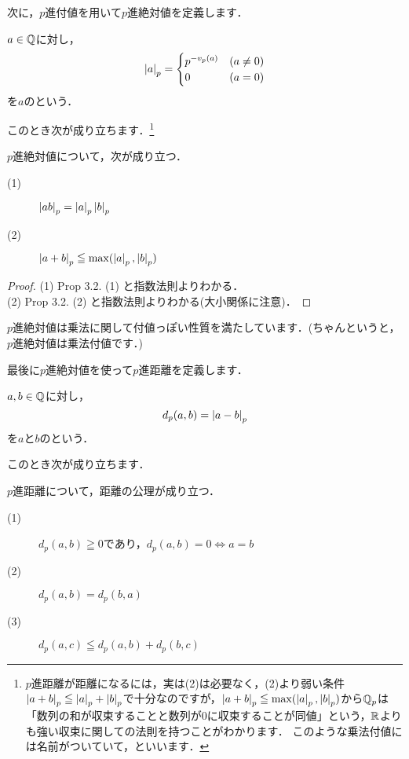 \documentclass[./main]{subfiles}
\begin{document}
次に，$p$進付値を用いて$p$進絶対値を定義します．

\begin{defi}
$a \in \mathbb{Q}$に対し，
\begin{equation*}
\left\lvert a\right\rvert_p= \begin{cases}
	p^{-v_p(a)} &(a \neq 0)\\
	0 &(a=0)
	\end{cases}
\end{equation*}
を$a$のという．
\end{defi}

このとき次が成り立ちます．\footnote{$p$進距離が距離になるには，実は(2)は必要なく，(2)より弱い条件$\left\lvert a+b\right\rvert_p \leqq \left\lvert a\right\rvert_p+\left\lvert b\right\rvert_p$で十分なのですが，$\left\lvert a+b\right\rvert_p \leqq \max(\left\lvert a\right\rvert_p,\left\lvert b\right\rvert_p)$から$\mathbb{Q}_p$は「数列の和が収束することと数列が0に収束することが同値」という，$\mathbb{R}$よりも強い収束に関しての法則を持つことがわかります．
このような乗法付値には名前がついていて，といいます．}
\begin{prop}
$p$進絶対値について，次が成り立つ．
\begin{description}
	\item[(1)] $\left\lvert ab\right\rvert_p=\left\lvert a\right\rvert_p \left\lvert b\right\rvert_p$
	\item[(2)] $\left\lvert a+b\right\rvert_p \leqq \max(\left\lvert a\right\rvert_p,\left\lvert b\right\rvert_p)$
\end{description}
\end{prop}

\begin{proof}
	(1) Prop 3.2. (1) と指数法則よりわかる．\\
	(2) Prop 3.2. (2) と指数法則よりわかる(大小関係に注意)．
\end{proof}


$p$進絶対値は乗法に関して付値っぽい性質を満たしています．(ちゃんというと，$p$進絶対値は乗法付値です．)

最後に$p$進絶対値を使って$p$進距離を定義します．

\begin{defi}
$a,b \in \mathbb{Q}$に対し，
\begin{equation*}
d_p(a,b)=\left\lvert a-b\right\rvert_p
\end{equation*}
を$a$と$b$のという．
\end{defi}

このとき次が成り立ちます．
\begin{theo}
$p$進距離について，距離の公理が成り立つ．
\begin{description}
	\item[(1)] $d_p(a,b) \geqq	0$であり，$d_p(a,b)=0 \Longleftrightarrow a=b$ 
	\item[(2)] $d_p(a,b)=d_p(b,a)$ 
	\item[(3)] $d_p(a,c) \leqq d_p(a,b) +d_p(b,c)$
\end{description}
\end{theo}
\end{document}
